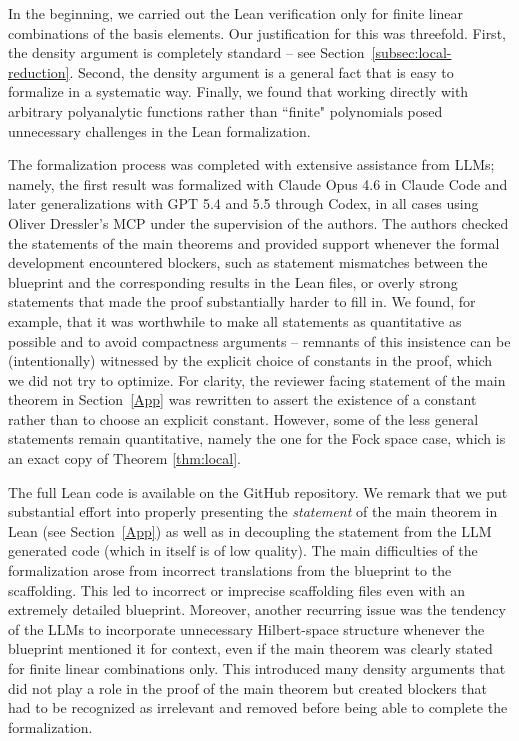\documentclass[11pt]{amsart}
\theoremstyle{remark}
\begin{document}
In the beginning, we carried out the Lean verification only for finite linear combinations of the basis elements. Our justification for this was threefold. First, the density argument is completely standard -- see Section~\ref{subsec:local-reduction}. Second, the density argument is a general fact that is easy to formalize in a systematic way. Finally, we found that working directly with arbitrary polyanalytic functions rather than ``finite" polynomials posed unnecessary challenges in the Lean formalization.
 \vspace{0.5em}



The formalization process was completed with extensive assistance from LLMs; namely, the first result was formalized with Claude Opus 4.6 in Claude Code and later generalizations with GPT 5.4 and 5.5 through Codex, in all cases using Oliver Dressler's MCP \cite{DresslerMCP} under the supervision of the authors. The authors checked the statements of the main theorems and provided support whenever the formal development encountered blockers, such as statement mismatches between the blueprint and the corresponding results in the Lean files, or overly strong statements that made the proof substantially harder to fill in. We found, for example, that it was worthwhile to make all statements as quantitative as possible and to avoid  compactness arguments -- remnants of this insistence can be (intentionally) witnessed by the explicit choice of constants in the proof, which we did not try to optimize. For clarity, the reviewer facing statement of the main theorem in Section~\ref{App} was rewritten to assert the existence of a constant rather than to choose an explicit constant. However, some of the less general statements remain quantitative, namely the one for the Fock space case, which is an exact copy of Theorem \ref{thm:local}. 
 \vspace{0.5em}

The full Lean code is available on the GitHub repository. We remark that we put substantial effort into properly presenting the \emph{statement} of the main theorem in Lean (see Section~\ref{App}) as well as in decoupling the statement from the LLM generated code (which in itself is of low quality). The main difficulties of the formalization arose from incorrect translations from the blueprint to the scaffolding. This led to incorrect or imprecise scaffolding files even with an extremely detailed blueprint. Moreover, another recurring issue was the tendency of the LLMs to incorporate unnecessary Hilbert-space structure whenever the blueprint mentioned it for context, even if the main theorem was clearly stated for finite linear combinations only. This introduced many density arguments that did not play a role in the proof of the main theorem but created blockers that had to be recognized as irrelevant and removed before being able to complete the formalization. 
\end{document}
